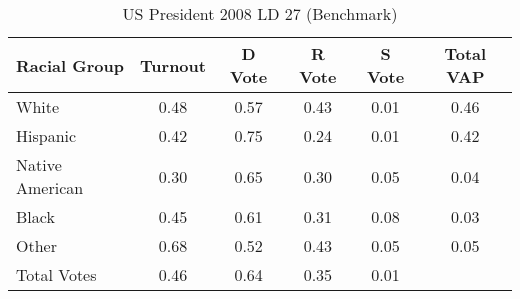 \begin{table}[htb]
\begin{center}
\caption{US President 2008 LD 27 (Benchmark)}
\label{pres08_vap_ld_27_benchmark}
\begin{tabular}{lccccc}
  \hline
Racial Group & Turnout & D Vote & R Vote & S Vote & Total VAP \\ 
  \hline
White & 0.48 & 0.57 & 0.43 & 0.01 & 0.46 \\ 
  Hispanic & 0.42 & 0.75 & 0.24 & 0.01 & 0.42 \\ 
  Native American & 0.30 & 0.65 & 0.30 & 0.05 & 0.04 \\ 
  Black & 0.45 & 0.61 & 0.31 & 0.08 & 0.03 \\ 
  Other & 0.68 & 0.52 & 0.43 & 0.05 & 0.05 \\ 
  Total Votes & 0.46 & 0.64 & 0.35 & 0.01 &  \\ 
   \hline
\end{tabular}
\end{center}
\end{table}
